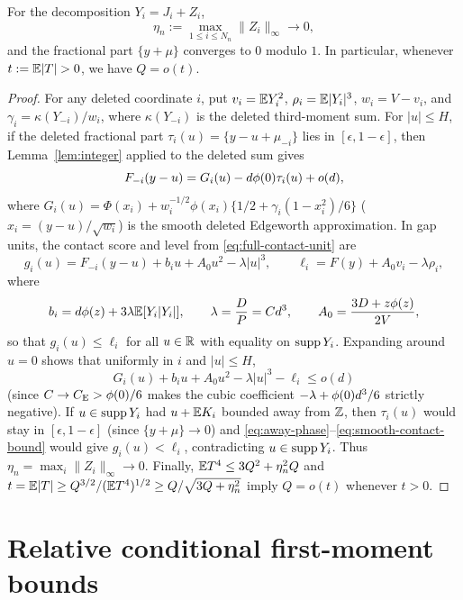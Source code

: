 \begin{lemma}\label{lem:whole-phase}
For the decomposition $Y_i=J_i+Z_i$,
\begin{equation}\label{eq:whole-phase}
       \eta_n:=\max_{1\le i\le N_n}\|Z_i\|_\infty\longrightarrow0,
\end{equation}
and the fractional part $\{y+\mu\}$ converges to $0$ modulo $1$. In
particular, whenever $t:=\E|T|>0$, we have $Q=o(t)$.
\end{lemma}
\begin{proof}
For any deleted coordinate $i$, put $v_i=\mathbb E Y_i^2$, $\rho_i=\mathbb E|Y_i|^3$,
$w_i=V-v_i$, and $\gamma_i=\kappa(Y_{-i})/w_i$, where $\kappa(Y_{-i})$ is the
deleted third-moment sum. For $|u|\le H$, if the deleted fractional part
$\tau_i(u)=\{y-u+\mu_{-i}\}$ lies in $[\epsilon,1-\epsilon]$, then
Lemma~\ref{lem:integer} applied to the deleted sum gives
\begin{equation}\label{eq:away-phase}
               F_{-i}(y-u)=G_i(u)-d\phi(0)\tau_i(u)+o(d),
\end{equation}
where $G_i(u)=\Phi(x_i)+w_i^{-1/2}\phi(x_i)\{1/2+\gamma_i(1-x_i^2)/6\}$
($x_i=(y-u)/\sqrt{w_i}$) is the smooth deleted Edgeworth approximation. In
gap units, the contact score and level from \eqref{eq:full-contact-unit} are
\[
 g_i(u)=F_{-i}(y-u)+b_iu+A_0u^2-\lambda|u|^3,\qquad
 \ell_i=F(y)+A_0v_i-\lambda\rho_i,
\]
where
\[
 b_i=d\phi(z)+3\lambda\mathbb E[Y_i|Y_i|],\qquad
 \lambda=\frac DP=Cd^3,\qquad
 A_0=\frac{3D+z\phi(z)}{2V},
\]
so that $g_i(u)\le\ell_i$ for all $u\in\mathbb R$ with equality on $\operatorname{supp} Y_i$.
Expanding around $u=0$ shows that uniformly in $i$ and $|u|\le H$,
\begin{equation}\label{eq:smooth-contact-bound}
       G_i(u)+b_iu+A_0u^2-\lambda|u|^3-\ell_i\le o(d)
\end{equation}
(since $C\to C_{\mathrm E}>\phi(0)/6$ makes the cubic coefficient $-\lambda+\phi(0) d^3/6$
strictly negative). If $u\in\operatorname{supp} Y_i$ had $u+\mathbb E K_i$ bounded away from $\mathbb Z$,
then $\tau_i(u)$ would stay in $[\epsilon,1-\epsilon]$ (since $\{y+\mu\}\to0$)
and \eqref{eq:away-phase}--\eqref{eq:smooth-contact-bound} would give
$g_i(u)<\ell_i$, contradicting $u\in\operatorname{supp} Y_i$.
Thus $\eta_n=\max_i\|Z_i\|_\infty\to0$. Finally, $\mathbb E T^4\le3Q^2+\eta_n^2Q$
and $t=\mathbb E|T|\ge Q^{3/2}/(\mathbb E T^4)^{1/2}\ge Q/\sqrt{3Q+\eta_n^2}$ imply
$Q=o(t)$ whenever $t>0$.
\end{proof}

\section{Relative conditional first-moment bounds}\label{sec:relative}

